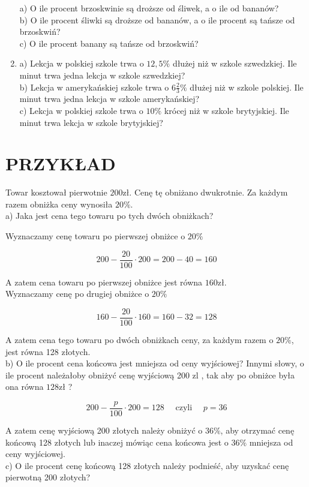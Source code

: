 \documentclass[10pt]{article}
\begin{document}
\begin{enumerate}
a) O ile procent brzoskwinie są droższe od śliwek, a o ile od bananów?\\
b) O ile procent śliwki są droższe od bananów, a o ile procent są tańsze od brzoskwiń?\\
c) O ile procent banany są tańsze od brzoskwiń?
  \item a) Lekcja w polskiej szkole trwa o \(12,5 \%\) dłużej niż w szkole szwedzkiej. Ile minut trwa jedna lekcja w szkole szwedzkiej?\\
b) Lekcja w amerykańskiej szkole trwa o \(6 \frac{2}{3} \%\) dłużej niż w szkole polskiej. Ile minut trwa jedna lekcja w szkole amerykańskiej?\\
c) Lekcja w polskiej szkole trwa o \(10 \%\) krócej niż w szkole brytyjskiej. Ile minut trwa lekcja w szkole brytyjskiej?
\end{enumerate}

\section*{PRZYKŁAD}
Towar kosztował pierwotnie \(200 \mathrm{zł}\). Cenę tę obniżano dwukrotnie. Za każdym razem obniżka ceny wynosiła \(20 \%\).\\
a) Jaka jest cena tego towaru po tych dwóch obniżkach?

Wyznaczamy cenę towaru po pierwszej obniżce o \(20 \%\)

\[
200-\frac{20}{100} \cdot 200=200-40=160
\]

A zatem cena towaru po pierwszej obniżce jest równa \(160 \mathrm{zł}\).\\
Wyznaczamy cenę po drugiej obniżce o \(20 \%\)

\[
160-\frac{20}{100} \cdot 160=160-32=128
\]

A zatem cena tego towaru po dwóch obniżkach ceny, za każdym razem o \(20 \%\), jest równa 128 złotych.\\
b) O ile procent cena końcowa jest mniejsza od ceny wyjściowej? Innymi słowy, o ile procent należałoby obniżyć cenę wyjściową 200 zl , tak aby po obniżce była ona równa \(128 \mathrm{zł}\) ?

\[
200-\frac{p}{100} \cdot 200=128 \quad \text { czyli } \quad p=36
\]

A zatem cenę wyjściową 200 złotych należy obniżyć o \(36 \%\), aby otrzymać cenę końcową 128 złotych lub inaczej mówiąc cena końcowa jest o \(36 \%\) mniejsza od ceny wyjściowej.\\
c) O ile procent cenę końcową 128 złotych należy podnieść, aby uzyskać cenę pierwotną 200 złotych?
\end{document}
